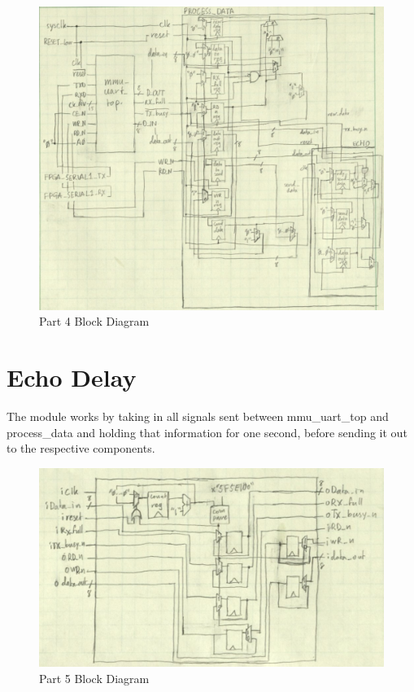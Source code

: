 \documentclass{article}
\begin{document}
	\begin{figure}[h]
		\begin{center}
			\includegraphics[scale=0.6]{../part4_files/part4_block_diagram.png}
			\caption{Part 4 Block Diagram}
		\end{center}
	\end{figure}

\section{Echo Delay}
The module works by taking in all signals sent between mmu\_uart\_top and process\_data and holding that information for one second, before sending it out to the respective components.


	\begin{figure}[h]
		\begin{center}
			\includegraphics[scale=0.6]{../part5_files/part5_block_diagram.png}
			\caption{Part 5 Block Diagram}
		\end{center}
	\end{figure}
\end{document}
